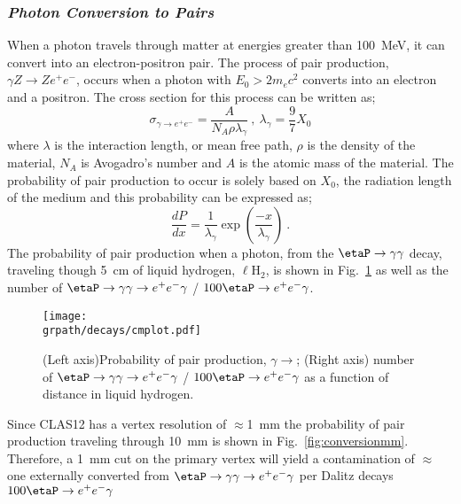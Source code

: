 \subsubsection{\emph{Photon Conversion to \epem Pairs}}\label{sec:intro.conversion}
When a photon travels through matter at energies greater than 100~MeV, it can convert into an electron-positron pair. The process of pair production, $\gamma Z \rightarrow Ze^{+}e^{-}$, occurs when a photon with $E_0 > 2 m_e c^2$ converts into an electron and a positron. The cross section for this process can be written as;
\begin{equation}\label{pair_crosssection}
\sigma_{\gamma\rightarrow e^+e^-} =  \frac{A}{N_{A} \rho \lambda_\gamma}  \ ,\ \lambda_\gamma = \frac{9}{7}X_0
\end{equation}
where $\lambda$ is the interaction length, or mean free path, $\rho$ is the density of the material, $N_A$ is Avogadro's number and $A$ is the atomic mass of the material. The probability of pair production to occur is solely based on $X_{0}$, the radiation length of the medium and this probability can be expressed as;
\begin{equation}
\frac{dP}{dx} = \frac{1}{\lambda_\gamma}\exp(\frac{-x}{\lambda_\gamma}) \ .
\end{equation}
%
%
The probability of pair production when a photon, from the $\etaP \to \gamma \gamma$ decay, traveling though 5~cm of liquid hydrogen, $\ell$H$_2$, is shown in Fig.~\ref{fig:conversion} as well as the number of $\etaP \to \gamma \gamma \rightarrow e^+e^- \gamma$ / $100 \etaP \rightarrow e^+e^- \gamma$. 
\begin{figure}[h!]\begin{center}
\texttt{[image: \\grpath/decays/cmplot.pdf]}
\caption[Probability of pair production, $\gamma \to$\epem, as a function of distance in liquid hydrogen]{\label{fig:conversion}{(Left axis)Probability of pair production, $\gamma \to$\epem; (Right axis) number of $\etaP \to \gamma \gamma \rightarrow e^+e^- \gamma$ / $100 \etaP \rightarrow e^+e^- \gamma$ as a function of distance in liquid hydrogen.}}
\end{center}\end{figure}
Since CLAS12 has a vertex resolution of $\approx$1~mm the probability of pair production traveling through 10~mm is shown in Fig.~\ref{fig:conversionmm}. Therefore, a 1~mm cut on the primary vertex will yield a contamination of $\approx$ one externally converted \epem from $\etaP \to \gamma \gamma \rightarrow e^+e^- \gamma$ per Dalitz decays $100 \etaP \rightarrow e^+e^- \gamma$
